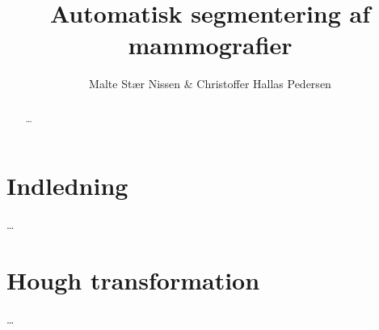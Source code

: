 \documentclass[11pt,a4paper]{article}
\title{Automatisk segmentering af mammografier}
\author{Malte Stær Nissen \& Christoffer Hallas Pedersen}
\begin{document}

\newpage
\clearpage
{}
\tableofcontents

\newpage

\begin{abstract}
\ldots
\end{abstract}

\newpage

\clearpage
{}

\section{Indledning}
\ldots

\section{Hough transformation}
\ldots



\end{document}
